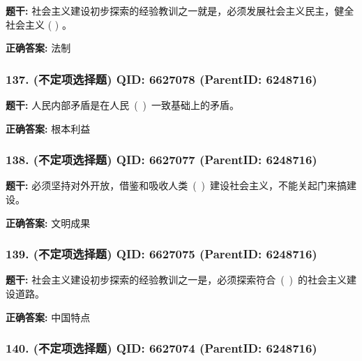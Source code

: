 \documentclass[12pt,UTF8]{ctexart}
\begin{document}
\textbf{题干:}
社会主义建设初步探索的经验教训之一就是，必须发展社会主义民主，健全社会主义 ( ) 。



\textbf{正确答案:}
法制

\vspace{0.3em}\hrulefill\vspace{0.7em}

\subsubsection*{137. (不定项选择题) \small QID: 6627078 (ParentID: 6248716)}

\textbf{题干:}
人民内部矛盾是在人民 ( ) 一致基础上的矛盾。



\textbf{正确答案:}
根本利益

\vspace{0.3em}\hrulefill\vspace{0.7em}

\subsubsection*{138. (不定项选择题) \small QID: 6627077 (ParentID: 6248716)}

\textbf{题干:}
必须坚持对外开放，借鉴和吸收人类 ( ) 建设社会主义，不能关起门来搞建设。



\textbf{正确答案:}
文明成果

\vspace{0.3em}\hrulefill\vspace{0.7em}

\subsubsection*{139. (不定项选择题) \small QID: 6627075 (ParentID: 6248716)}

\textbf{题干:}
社会主义建设初步探索的经验教训之一是，必须探索符合 ( ) 的社会主义建设道路。



\textbf{正确答案:}
中国特点

\vspace{0.3em}\hrulefill\vspace{0.7em}

\subsubsection*{140. (不定项选择题) \small QID: 6627074 (ParentID: 6248716)}
\end{document}
